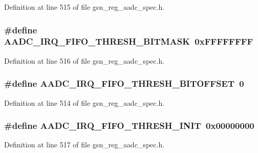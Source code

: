 Definition at line 515 of file gsn\_\-reg\_\-aadc\_\-spec.h.

\hypertarget{a00543_ade1b3d4bbc8b86c34dcd58cee4a3158a}{
\subsubsection[{AADC\_\-IRQ\_\-FIFO\_\-THRESH\_\-BITMASK}]{\setlength{\rightskip}{0pt plus 5cm}\#define AADC\_\-IRQ\_\-FIFO\_\-THRESH\_\-BITMASK~0xFFFFFFFF}}
\label{a00543_ade1b3d4bbc8b86c34dcd58cee4a3158a}


Definition at line 516 of file gsn\_\-reg\_\-aadc\_\-spec.h.

\hypertarget{a00543_a29974ebbdde14f701f18a4e4b81ac4cd}{
\subsubsection[{AADC\_\-IRQ\_\-FIFO\_\-THRESH\_\-BITOFFSET}]{\setlength{\rightskip}{0pt plus 5cm}\#define AADC\_\-IRQ\_\-FIFO\_\-THRESH\_\-BITOFFSET~0}}
\label{a00543_a29974ebbdde14f701f18a4e4b81ac4cd}


Definition at line 514 of file gsn\_\-reg\_\-aadc\_\-spec.h.

\hypertarget{a00543_a91e2e8dbeb3ebeee728b5d42c4d7a554}{
\subsubsection[{AADC\_\-IRQ\_\-FIFO\_\-THRESH\_\-INIT}]{\setlength{\rightskip}{0pt plus 5cm}\#define AADC\_\-IRQ\_\-FIFO\_\-THRESH\_\-INIT~0x00000000}}
\label{a00543_a91e2e8dbeb3ebeee728b5d42c4d7a554}


Definition at line 517 of file gsn\_\-reg\_\-aadc\_\-spec.h.


